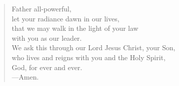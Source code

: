 \prayer

\setlength{\vleftmargin}{\prayerleftmargini}

\begin{verse}
Father all-powerful,\\
let your radiance dawn in our lives,\\
that we may walk in the light of your law\\
with you as our leader.\\
We ask this through our Lord Jesus Christ, your Son,\\
who lives and reigns with you and the Holy Spirit,\\
God, for ever and ever.\\
{\color{red}---\thinspace}Amen.
\end{verse}

\setlength{\vleftmargin}{\defleftmargini}